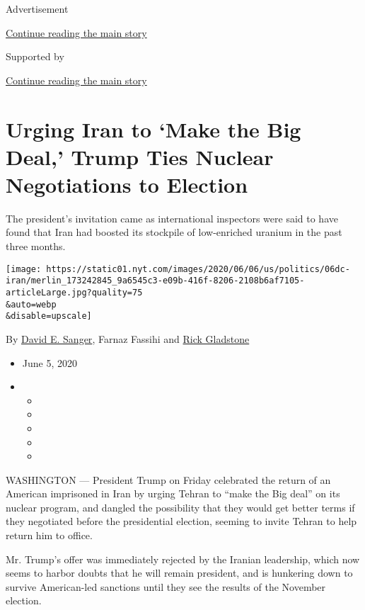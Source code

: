 Advertisement

\protect\hyperlink{after-top}{Continue reading the main story}

Supported by

\protect\hyperlink{after-sponsor}{Continue reading the main story}

\hypertarget{urging-iran-to-make-the-big-deal-trump-ties-nuclear-negotiations-to-election}{%
\section{Urging Iran to `Make the Big Deal,' Trump Ties Nuclear
Negotiations to
Election}\label{urging-iran-to-make-the-big-deal-trump-ties-nuclear-negotiations-to-election}}

The president's invitation came as international inspectors were said to
have found that Iran had boosted its stockpile of low-enriched uranium
in the past three months.

\texttt{[image: https://static01.nyt.com/images/2020/06/06/us/politics/06dc-iran/merlin\_173242845\_9a6545c3-e09b-416f-8206-2108b6af7105-articleLarge.jpg?quality=75\\\&auto=webp\\\&disable=upscale]}

By \href{https://www.nytimes.com/by/david-e-sanger}{David E. Sanger},
Farnaz Fassihi and \href{https://www.nytimes.com/by/rick-gladstone}{Rick
Gladstone}

\begin{itemize}
\item
  June 5, 2020
\item
  \begin{itemize}
  \item
  \item
  \item
  \item
  \item
  \end{itemize}
\end{itemize}

WASHINGTON --- President Trump on Friday celebrated the return of an
American imprisoned in Iran by urging Tehran to ``make the Big deal'' on
its nuclear program, and dangled the possibility that they would get
better terms if they negotiated before the presidential election,
seeming to invite Tehran to help return him to office.

Mr. Trump's offer was immediately rejected by the Iranian leadership,
which now seems to harbor doubts that he will remain president, and is
hunkering down to survive American-led sanctions until they see the
results of the November election.

